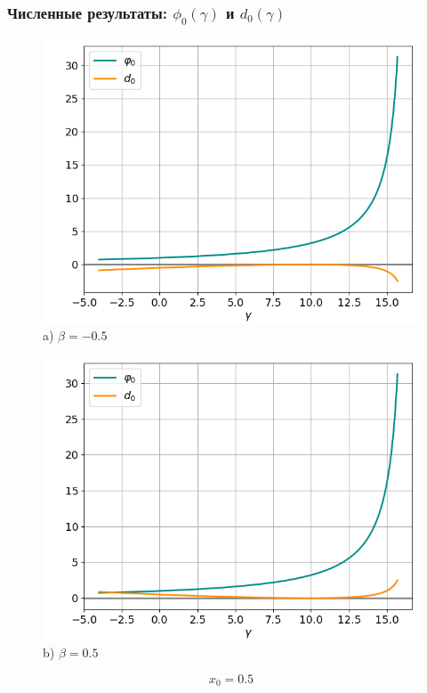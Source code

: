 \documentclass[fullscreen=true, unicode, bookmarks=false]{beamer}
\begin{document}
\begin{frame}
\frametitle{ Численные результаты: $ \phi_0(\gamma) $ и $ d_0(\gamma) $ }

\begin{figure} 
\begin{minipage}[h]{0.49\linewidth}
\begin{center}
\includegraphics[scale=0.38]{divergent_phi0d0_x0=0,5,beta=-0,5.png} \\ {\scriptsize a) $ \beta = -0.5 $}
\end{center}
\end{minipage} 
\hfill
\begin{minipage}[h]{0.49\linewidth}
\begin{center}
\includegraphics[scale=0.38]{divergent_phi0d0_x0=0,5,beta=0,5.png}  \\ {\scriptsize b) $ \beta = 0.5 $}
\end{center}
\end{minipage} 
\end{figure}

$$ x_0 = 0.5 $$

\end{frame}
\end{document}
